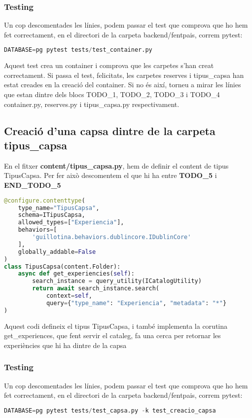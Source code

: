 \documentclass[a4paper, 11pt]{article}
\begin{document}
\subsubsection{Testing}
  Un cop descomentades les línies, podem passar el test que comprova
  que ho hem fet correctament, en el directori de la carpeta
  backend/fentpais, correm pytest:
  \begin{lstlisting}[language=Python, caption=Testing 1]
    DATABASE=pg pytest tests/test_container.py
  \end{lstlisting}
  
  Aquest test crea un container i comprova que les carpetes s'han
  creat correctament. Si passa el test, felicitats, les carpetes
  reserves i tipus\_capsa han estat creades en la creació del
  container. Si no és així, torneu a mirar les línies que estan dintre
  dels blocs TODO\_1, TODO\_2, TODO\_3 i TODO\_4 container.py,
  reserves.py i tipus\_capsa.py respectivament.

\subsection{Creació d'una capsa dintre de la carpeta tipus\_capsa}
En el fitxer \textbf{content/tipus\_capsa.py}, hem de definir el content de tipus
  TipusCapsa. Per fer això descomentem el que hi ha entre
  \textbf{TODO\_5} i \textbf{END\_TODO\_5}

\begin{lstlisting}[language=Python, caption=Definició content type TipusCapsa]
@configure.contenttype(
    type_name="TipusCapsa",
    schema=ITipusCapsa,
    allowed_types=["Experiencia"],
    behaviors=[
        'guillotina.behaviors.dublincore.IDublinCore'
    ],
    globally_addable=False
)
class TipusCapsa(content.Folder):
    async def get_experiencies(self):
        search_instance = query_utility(ICatalogUtility)
        return await search_instance.search(
            context=self,
            query={"type_name": "Experiencia", "metadata": "*"}
)
\end{lstlisting}

Aquest codi defineix el tipus TipusCapsa, i també implementa la
corutina get\_experiences, que fent servir el cataleg, fa una cerca per
retornar les experiències que hi ha dintre de la capsa

\subsubsection{Testing}
Un cop descomentades les línies, podem passar el test que comprova
  que ho hem fet correctament, en el directori de la carpeta
  backend/fentpais, correm pytest:
  \begin{lstlisting}[language=Python, caption=Testing 2]
    DATABASE=pg pytest tests/test_capsa.py -k test_creacio_capsa
  \end{lstlisting}
\end{document}
